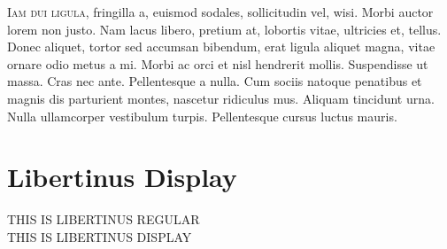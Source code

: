 \documentclass{article}
\begin{document}
\lettrine[lines=3,nindent=0pt]{\LibertinusInitials I}{am dui ligula}, fringilla a, euismod sodales, sollicitudin vel, wisi. Morbi auctor lorem
non justo. Nam lacus libero, pretium at, lobortis vitae, ultricies et, tellus. Donec aliquet,
tortor sed accumsan bibendum, erat ligula aliquet magna, vitae ornare odio metus a mi.
Morbi ac orci et nisl hendrerit mollis. Suspendisse ut massa. Cras nec ante. Pellentesque a
nulla. Cum sociis natoque penatibus et magnis dis parturient montes, nascetur ridiculus
mus. Aliquam tincidunt urna. Nulla ullamcorper vestibulum turpis. Pellentesque cursus
luctus mauris.

\section{Libertinus Display}

\begin{center}\Huge
THIS IS LIBERTINUS REGULAR\\
{\LibertinusDisplay THIS IS LIBERTINUS DISPLAY}
\end{center}
\end{document}
